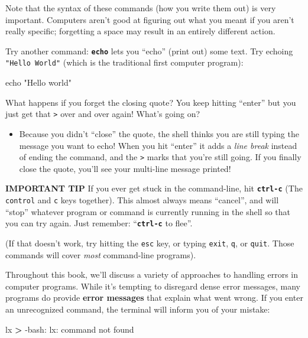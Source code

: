 \documentclass[]{book}
\newenvironment{Shaded}{\begin{snugshade}}{\end{snugshade}}
\newcommand{\StringTok}[1]{\textcolor[rgb]{0.31,0.60,0.02}{#1}}
\newcommand{\OperatorTok}[1]{\textcolor[rgb]{0.81,0.36,0.00}{\textbf{#1}}}
\newcommand{\BuiltInTok}[1]{#1}
\newcommand{\ExtensionTok}[1]{#1}
\newcommand{\NormalTok}[1]{#1}
\providecommand{\tightlist}{%
  \setlength{\itemsep}{0pt}\setlength{\parskip}{0pt}}
\theoremstyle{definition}
\theoremstyle{definition}
\theoremstyle{remark}
\begin{document}
Note that the syntax of these commands (how you write them out) is very
important. Computers aren't good at figuring out what you meant if you
aren't really specific; forgetting a space may result in an entirely
different action.

Try another command: \textbf{\texttt{echo}} lets you ``echo'' (print
out) some text. Try echoing \texttt{"Hello\ World"} (which is the
traditional first computer program):

\begin{Shaded}
\begin{Highlighting}[]
\BuiltInTok{echo} \StringTok{"Hello world"}
\end{Highlighting}
\end{Shaded}

What happens if you forget the closing quote? You keep hitting ``enter''
but you just get that \texttt{\textgreater{}} over and over again!
What's going on?

\begin{itemize}
\tightlist
\item
  Because you didn't ``close'' the quote, the shell thinks you are still
  typing the message you want to echo! When you hit ``enter'' it adds a
  \emph{line break} instead of ending the command, and the
  \texttt{\textgreater{}} marks that you're still going. If you finally
  close the quote, you'll see your multi-line message printed!
\end{itemize}

\textbf{IMPORTANT TIP} If you ever get stuck in the command-line, hit
\textbf{\texttt{ctrl-c}} (The \texttt{control} and \texttt{c} keys
together). This almost always means ``cancel'', and will ``stop''
whatever program or command is currently running in the shell so that
you can try again. Just remember: ``\textbf{\texttt{ctrl-c}} to flee''.

(If that doesn't work, try hitting the \texttt{esc} key, or typing
\texttt{exit}, \texttt{q}, or \texttt{quit}. Those commands will cover
\emph{most} command-line programs).

Throughout this book, we'll discuss a variety of approaches to handling
errors in computer programs. While it's tempting to disregard dense
error messages, many programs do provide \textbf{error messages} that
explain what went wrong. If you enter an unrecognized command, the
terminal will inform you of your mistake:

\begin{Shaded}
\begin{Highlighting}[]
\ExtensionTok{lx}
\OperatorTok{>} \ExtensionTok{-bash}\NormalTok{: lx: command not found}
\end{Highlighting}
\end{Shaded}
\end{document}
